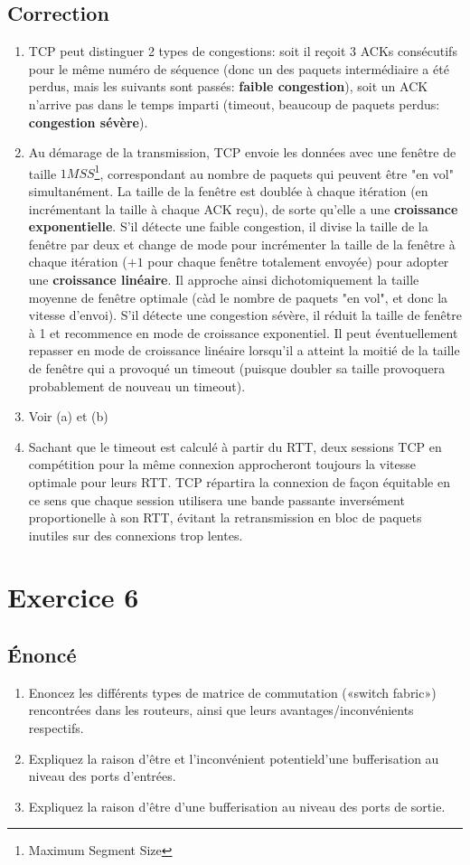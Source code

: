 \documentclass[a4paper, 11pt, titlepage]{article}
\begin{document}
\subsection{Correction}
\begin{enumerate}[label=(\alph*)]
\item TCP peut distinguer 2 types de congestions: soit il reçoit 3 ACKs consécutifs pour le même numéro de séquence (donc un des paquets intermédiaire a été perdus, mais les suivants sont passés: \textbf{faible congestion}), soit un ACK n'arrive pas dans le temps imparti (timeout, beaucoup de paquets perdus: \textbf{congestion sévère}).
\item Au démarage de la transmission, TCP envoie les données avec une fenêtre de taille $1MSS$\footnote{Maximum Segment Size}, correspondant au nombre de paquets qui peuvent être "en vol" simultanément. La taille de la fenêtre est doublée à chaque itération (en incrémentant la taille à chaque ACK reçu), de sorte qu'elle a une \textbf{croissance exponentielle}. S'il détecte une faible congestion, il divise la taille de la fenêtre par deux et change de mode pour incrémenter la taille de la fenêtre à chaque itération ($+1$ pour chaque fenêtre totalement envoyée) pour adopter une \textbf{croissance linéaire}. Il approche ainsi dichotomiquement la taille moyenne de fenêtre optimale (càd le nombre de paquets "en vol", et donc la vitesse d'envoi). S'il détecte une congestion sévère, il réduit la taille de fenêtre à 1 et recommence en mode de croissance exponentiel. Il peut éventuellement repasser en mode de croissance linéaire lorsqu'il a atteint la moitié de la taille de fenêtre qui a provoqué un timeout (puisque doubler sa taille provoquera probablement de nouveau un timeout).
\item Voir (a) et (b)
\item Sachant que le timeout est calculé à partir du RTT, deux sessions TCP en compétition pour la même connexion approcheront toujours la vitesse optimale pour leurs RTT. TCP répartira la connexion de façon équitable en ce sens que chaque session utilisera une bande passante inversément proportionelle à son RTT, évitant la retransmission en bloc de paquets inutiles sur des connexions trop lentes.
\end{enumerate}

\section{Exercice 6}
\subsection{\'Enoncé}
\begin{enumerate}[label=(\alph*)]
  \item Enoncez les différents types de matrice de commutation («switch fabric») rencontrées dans les routeurs, ainsi que leurs avantages/inconvénients respectifs.
  \item Expliquez la raison d’être et l’inconvénient potentield’une bufferisation au niveau des ports d’entrées.
  \item Expliquez la raison d’être d’une bufferisation au niveau des ports de sortie.
\end{enumerate}
\end{document}
